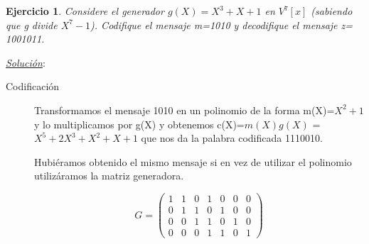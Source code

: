 \documentclass{beamer}
\theoremstyle{plain}
\theoremstyle{example}
\newtheorem{ejercicio} [Ejercicio]{Ejercicio}
\theoremstyle{example}
\begin{document}


\begin{frame}  \small \begin{ejercicio} 

Considere el generador $g(X)= X^3 + X +1$ en $V^7[x]$ (sabiendo que g divide $X^7-1$). Codifique el mensaje m=1010 y decodifique el mensaje z= 1001011.


\end{ejercicio} %
\textit{\underline{Solución}}:\\ 

\begin{description}

\item [Codificación]


Transformamos el mensaje 1010 en un polinomio de la forma m(X)=$X^2+1$ y lo multiplicamos por g(X) y obtenemos c(X)=$m(X)g(X)$ = $X^5+2X^3+X^2+X+1$ que nos da la palabra codificada 1110010.

Hubiéramos obtenido el mismo mensaje si en vez de utilizar el polinomio utilizáramos la matriz generadora.

\[
    G =   \left( \begin{array}{ccccccc}
     				  1 &  1  & 0  & 1 & 0  & 0  & 0\\ 
					  0 &  1  & 1	&  0 & 1 &	 0  & 0\\ 
					  0 &  0  & 1  &  1 & 0 & 1  & 0\\
					  0 &  0  & 0  &  1 & 1 & 0  & 1
           			\end{array}
    		\right) 	    		
\]

\end{description}

\end{frame} 
\end{document}
